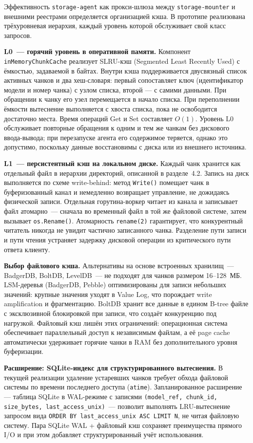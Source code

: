 Эффективность \texttt{storage-agent} как прокси-шлюза между \texttt{storage-mounter} и внешними реестрами определяется организацией кэша. В прототипе реализована трёхуровневая иерархия, каждый уровень которой обслуживает свой класс запросов.

\textbf{L0~--- горячий уровень в оперативной памяти.} Компонент \texttt{inMemoryChunkCache} реализует SLRU-кэш (Segmented Least Recently Used) с ёмкостью, задаваемой в байтах. Внутри кэша поддерживается двусвязный список активных чанков и два хеш-словаря: первый сопоставляет ключ (идентификатор модели и номер чанка) с узлом списка, второй — с самими данными. При обращении к чанку его узел перемещается в начало списка. При переполнении ёмкости вытеснение выполняется с хвоста списка, пока не освободится достаточно места. Время операций Get и Set составляет $O(1)$. Уровень L0 обслуживает повторные обращения к одним и тем же чанкам без дискового ввода-вывода; при перезапуске агента его содержимое теряется, однако это допустимо, поскольку данные восстановимы с диска или из внешнего источника.

\textbf{L1~--- персистентный кэш на локальном диске.} Каждый чанк хранится как отдельный файл в иерархии директорий, описанной в разделе~4.2. Запись на диск выполняется по схеме write-behind: метод \texttt{Write()} помещает чанк в буферизованный канал и немедленно возвращает управление, не дожидаясь физической записи. Отдельная горутина-воркер читает из канала и записывает файл атомарно~--- сначала во временный файл в той же файловой системе, затем вызывает \texttt{os.Rename()}. Атомарность \texttt{rename(2)} гарантирует, что конкурентный читатель никогда не увидит частично записанного чанка. Разделение пути записи и пути чтения устраняет задержку дисковой операции из критического пути ответа клиенту.

\textbf{Выбор файлового кэша.} Альтернативы на основе встроенных хранилищ~--- BadgerDB, BoltDB, LevelDB~--- не подходят для чанков размером 16--128~МБ. LSM-деревья (BadgerDB, Pebble) оптимизированы для записи небольших значений: крупные значения уходят в Value Log, что порождает write amplification и фрагментацию. BoltDB хранит все данные в едином B-tree файле с эксклюзивной блокировкой при записи, что создаёт конкуренцию под нагрузкой. Файловый кэш лишён этих ограничений: операционная система обеспечивает параллельный доступ к независимым файлам, а её page cache автоматически удерживает горячие чанки в RAM без дополнительного уровня буферизации.

\textbf{Расширение: SQLite-индекс для структурированного вытеснения.} В текущей реализации удаление устаревших чанков требует обхода файловой системы по времени последнего доступа (\texttt{atime}). Запланированное расширение --- таблица SQLite в WAL-режиме с записями \texttt{(model\_ref, chunk\_id, size\_bytes, last\_access\_unix)}~--- позволит выполнять LRU-вытеснение запросом вида \texttt{ORDER BY last\_access\_unix ASC LIMIT N}, не читая файловую систему. Пара SQLite WAL + файловый кэш сохраняет преимущества прямого I/O и при этом добавляет структурированный учёт использования.

